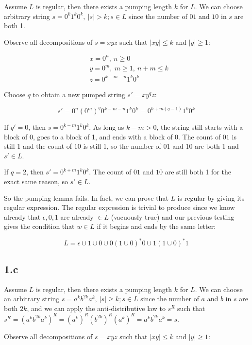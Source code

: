 \documentclass{article}
\begin{document}
Assume $L$ is regular, then there exists a pumping length $k$ for $L$. We can choose arbitrary string $s = 0^k 1^k 0^k, \: |s| > k; s \in L$ since the number of $01$ and $10$ in $s$ are both 1.

Observe all decompositions of $s = xyz$ such that $|xy| \leq k$ and $|y| \geq 1$:

\begin{align*}
&x = 0^n, \: n \geq 0\\
&y = 0^m, \: m \geq 1, \: n+m \leq k\\
&z = 0^{k-m-n} 1^k 0^k
\end{align*}

Choose $q$ to obtain a new pumped string $s'=xy^qz$: 

$$s' = 0^n (0^m)^q 0^{k-m-n} 1^k 0^k = 0^{k+m(q-1)} 1^k 0^k$$

If $q' = 0$, then $s = 0^{k-m} 1^k 0^k$. As long as $k - m > 0$, the string still starts with a block of 0, goes to a block of 1, and ends with a block of 0. The count of $01$ is still 1 and the count of $10$ is still 1, so the number of $01$ and $10$ are both 1 and $s' \in L$.

If $q = 2$, then $s' = 0^{k+m} 1^k 0^k$. The count of $01$ and $10$ are still both 1 for the exact same reason, so $s' \in L$.

So the pumping lemma fails. In fact, we can prove that $L$ is regular by giving its regular expression. The regular expression is trivial to produce since we know already that $\epsilon, 0, 1$ are already $\in L$ (vacuously true) and our previous testing gives the condition that $w \in L$ if it begins and ends by the same letter:

$$L = \epsilon \cup 1 \cup 0 \cup 0(1\cup0)^*0 \cup 1(1\cup0)^*1$$



\subsection*{1.c}

Assume $L$ is regular, then there exists a pumping length $k$ for $L$. We can choose an arbitrary string $s = a^k b^{2k} a^k, \: |s| \geq k; s \in L$ since the number of $a$ and $b$ in $s$ are both $2k$, and we can apply the anti-distributive law to $s^R$ such that $s^R = (a^k b^{2k} a^k)^R = (a^k)^R (b^{2k})^R (a^k)^R = a^k b^{2k} a^k = s$.

Observe all decompositions of $s = xyz$ such that $|xy| \leq k$ and $|y| \geq 1$:
\end{document}
